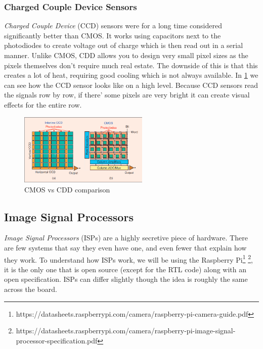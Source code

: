 \subsubsection{Charged Couple Device Sensors}
\textit{Charged Couple Device} (CCD) sensors were for a long time considered
significantly better than CMOS. It works using capacitors next to the
photodiodes to create voltage out of charge which is then read out in a serial
manner. Unlike CMOS, CDD allows you to design very small pixel sizes as the
pixels themselves don't require much real estate. The downside of this is that
this creates a lot of heat, requiring good cooling which is not always
available. In \cref{fig:cmosvsccd} we can see how the CCD sensor looks like on
a high level. Because CCD sensors read the signals row by row, if there' some
pixels are very bright it can create visual effects for the entire row.

\begin{figure}
    \begin{center}
        \includegraphics[width=0.55\textwidth]{figures/cmos_vs_cdd}
    \end{center}
    \caption{CMOS vs CDD comparison\cite{ieeeCMOS}}\label{fig:cmosvsccd}
\end{figure}


\newpage
\subsection{Image Signal Processors} \label{section:isp}
\textit{Image Signal Processors} (ISPs) are a highly secretive piece of
hardware. There are few systems that say they even have one, and even fewer
that explain how they work. To understand how ISPs work, we will be using the
Raspberry Pi\footnote[2]{https://datasheets.raspberrypi.com/camera/raspberry-pi-camera-guide.pdf}
\footnote{https://datasheets.raspberrypi.com/camera/raspberry-pi-image-signal-processor-specification.pdf},
it is the only one that is open source (except for the RTL code) along with an
open specification. ISPs can differ slightly though the idea is roughly the
same across the board.

